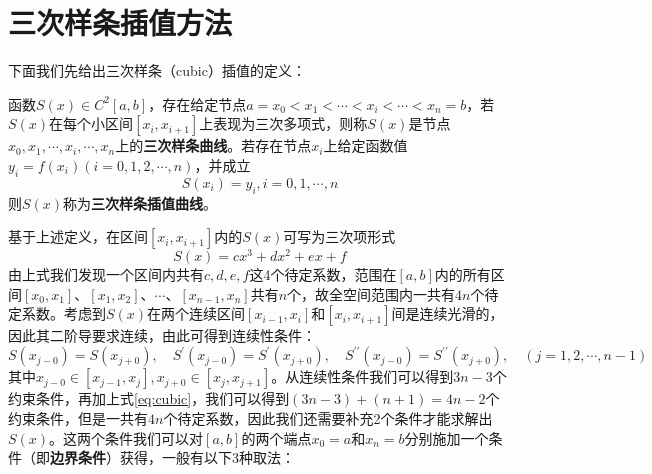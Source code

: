 \section{三次样条插值方法}
下面我们先给出三次样条（cubic）插值的定义：
\begin{definition}[三次样条插值]
	函数$S(x) \in C^2 [a, b]$，存在给定节点$a = x_0 < x_1 < \cdots < x_i < \cdots < x_n = b$，若$S(x)$在每个小区间$[x_i, x_{i+1}]$上表现为三次多项式，则称$S(x)$是节点$x_0, x_1, \cdots, x_i , \cdots, x_n$上的\textbf{三次样条曲线}。若存在节点$x_i$上给定函数值$y_i = f(x_i)(i = 0, 1, 2, \cdots, n)$，并成立
	\begin{equation}
	    S(x_i) = y_i , i = 0, 1, \cdots, n
	\end{equation} 
	则$S(x)$称为\textbf{三次样条插值曲线}。	
\end{definition}
基于上述定义，在区间$[x_i, x_{i+1}]$内的$S(x)$可写为三次项形式
\begin{equation}
	S(x) = c x^3 + d x^2 + e x + f	\label{eq:cubic}
\end{equation} 
由上式我们发现一个区间内共有$c, d, e, f$这4个待定系数，范围在$[a, b]$内的所有区间$[x_0, x_1]$、$[x_1, x_2]$、$\cdots$、$[x_{n-1}, x_{n}]$共有$n$个，故全空间范围内一共有$4n$个待定系数。考虑到$S(x)$在两个连续区间$[x_{i-1}, x_i]$和$[x_i, x_{i+1}]$间是连续光滑的，因此其二阶导要求连续，由此可得到连续性条件：
	\begin{equation*}
		S(x_{j-0}) = S(x_{j+0}), \quad S^{\prime}(x_{j-0}) = S^{\prime}(x_{j+0}),\quad S^{\prime\prime}(x_{j-0}) = S^{\prime\prime}(x_{j+0}), \quad (j = 1, 2, \cdots, n-1)
	\end{equation*} 
	其中$x_{j-0}\in [x_{j-1}, x_j], x_{j+0} \in [x_{j}, x_{j+1}]$。从连续性条件我们可以得到$3n-3$个约束条件，再加上式\eqref{eq:cubic}，我们可以得到$(3n-3) + (n + 1)= 4n - 2$个约束条件，但是一共有$4n$个待定系数，因此我们还需要补充2个条件才能求解出$S(x)$。这两个条件我们可以对$[a, b]$的两个端点$x_0 = a$和$x_n = b$分别施加一个条件（即\textbf{边界条件}）获得，一般有以下3种取法：
